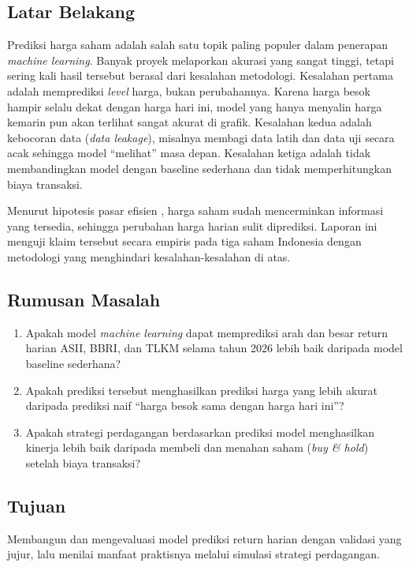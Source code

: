 \documentclass[11pt,a4paper]{article}
\begin{document}
\subsection{Latar Belakang}
Prediksi harga saham adalah salah satu topik paling populer dalam penerapan \emph{machine
learning}. Banyak proyek melaporkan akurasi yang sangat tinggi, tetapi sering kali hasil
tersebut berasal dari kesalahan metodologi. Kesalahan pertama adalah memprediksi
\emph{level} harga, bukan perubahannya. Karena harga besok hampir selalu dekat dengan harga
hari ini, model yang hanya menyalin harga kemarin pun akan terlihat sangat akurat di grafik.
Kesalahan kedua adalah kebocoran data (\emph{data leakage}), misalnya membagi data latih dan
data uji secara acak sehingga model ``melihat'' masa depan. Kesalahan ketiga adalah tidak
membandingkan model dengan baseline sederhana dan tidak memperhitungkan biaya transaksi.

Menurut hipotesis pasar efisien \citep{fama1970}, harga saham sudah mencerminkan informasi
yang tersedia, sehingga perubahan harga harian sulit diprediksi. Laporan ini menguji klaim
tersebut secara empiris pada tiga saham Indonesia dengan metodologi yang menghindari
kesalahan-kesalahan di atas.

\subsection{Rumusan Masalah}
\begin{enumerate}
  \item Apakah model \emph{machine learning} dapat memprediksi arah dan besar return harian
        ASII, BBRI, dan TLKM selama tahun 2026 lebih baik daripada model baseline sederhana?
  \item Apakah prediksi tersebut menghasilkan prediksi harga yang lebih akurat daripada
        prediksi naif ``harga besok sama dengan harga hari ini''?
  \item Apakah strategi perdagangan berdasarkan prediksi model menghasilkan kinerja lebih
        baik daripada membeli dan menahan saham (\emph{buy \& hold}) setelah biaya transaksi?
\end{enumerate}

\subsection{Tujuan}
Membangun dan mengevaluasi model prediksi return harian dengan validasi yang jujur, lalu
menilai manfaat praktisnya melalui simulasi strategi perdagangan.
\end{document}
